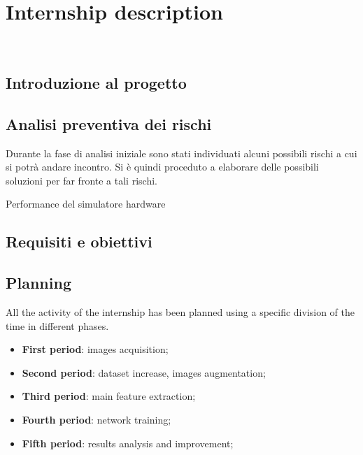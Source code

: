 \chapter{Internship description}
\label{cap:descrizione-stage}

\\

\section{Introduzione al progetto}

\section{Analisi preventiva dei rischi}

Durante la fase di analisi iniziale sono stati individuati alcuni possibili rischi a cui si potrà andare incontro.
Si è quindi proceduto a elaborare delle possibili soluzioni per far fronte a tali rischi.\\

\begin{risk}{Performance del simulatore hardware}
    \label{risk:hardware-simulator} 
\end{risk}

\section{Requisiti e obiettivi}


\section{Planning}
All the activity of the internship has been planned using a specific division of the time in different phases.\\
\begin{itemize}
    \item \textbf{First period}: images acquisition;
    \item \textbf{Second period}: dataset increase, images augmentation;
    \item \textbf{Third period}: main feature extraction;
    \item \textbf{Fourth period}: network training;
    \item \textbf{Fifth period}: results analysis and improvement;
\end{itemize}

